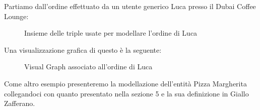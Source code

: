 \documentclass[12pt]{article}
\begin{document}
    \newline
    Partiamo dall'ordine effettuato da un utente generico Luca presso il Dubai Coffee Lounge:
    \begin{figure}[H]
        \caption{Insieme delle triple usate per modellare l'ordine di Luca}
    \end{figure}
    \newpage
    Una visualizzazione grafica di questo è la seguente:
    \begin{figure}[H]
        \caption{Visual Graph associato all'ordine di Luca}
    \end{figure}
    Come altro esempio presenteremo la modellazione dell'entità Pizza Margherita collegandoci con quanto presentato nella sezione 5 e la sua definizione in Giallo Zafferano.
\end{document}
